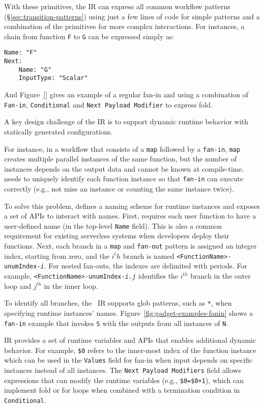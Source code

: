 With these primitives, the IR can express all common workflow patterns
(\S\ref{sec:transition-patterns}) using just a few lines of code for simple
patterns and a combination of the primitives for more complex interactions.
For instances, a chain from function \texttt{F} to \texttt{G} can be expressed
simply as:
\begin{verbatim}
Name: "F"
Next:
    Name: "G"
    InputType: "Scalar"
\end{verbatim}

And Figure~\ref{} gives an example of a regular fan-in and using a combination
of \texttt{Fan-in}, \texttt{Conditional} and \texttt{Next Payload Modifier} to
express fold.

A key design challenge of the \name{} IR is to support dynamic runtime
behavior with statically generated configurations.

For instance, in a workflow that consists of a \texttt{map} followed by a
\texttt{fan-in}, \texttt{map} creates multiple parallel instances of the same
function, but the number of instances depends on the output data and cannot be
known at compile-time. \name{} needs to uniquely identify each function
instance so that \texttt{fan-in} can execute correctly (e.g., not miss an
instance or counting the same instance twice).

To solve this problem, \name{} defines a naming scheme for runtime instances
and exposes a set of APIs to interact with names. First,
\name{} requires each user function to have a user-defined name (in the
top-level \texttt{Name} field). This is also a common requirement for existing
serverless systems when developers deploy their functions. Next, each branch
in a \texttt{map} and \texttt{fan-out} pattern is assigned an integer index,
starting from zero, and the $i^th$ branch is named
\texttt{<FunctionName>-unumIndex-\emph{i}}. For nested fan-outs, the indexes
are delimited with periods. For example,
\texttt{<FunctionName>-unumIndex-\emph{i.j}} identifies the $i^{th}$ branch in
the outer loop and $j^{th}$ in the inner loop.

To identify all branches, the \name{}~IR supports glob patterns, such as
\texttt{*}, when specifying runtime instances' names.
Figure~\ref{fig:gadget-examples-fanin} shows a \texttt{fan-in} example that
invokes \texttt{S} with the outputs from all instances of \texttt{N}.

\name{} IR provides a set of runtime variables and APIs that enables
additional dynamic behavior. For example, \texttt{\$0} refers to the
inner-most index of the function instance which can be used in the
\texttt{Values} field for fan-in when input depends on specific instances
instead of all instances. The \texttt{Next Payload Modifiers} field allows
expressions that can modify the runtime variables (e.g., \texttt{\$0=\$0+1}),
which can implement fold or for loops when combined with a termination
condition in \texttt{Conditional}.


